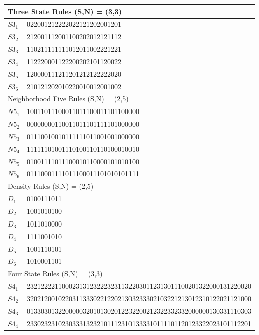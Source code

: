 \documentclass{article}
\begin{document}
\begin{multicols}{2}
\begin{table}[!htb] \centering
\small
\begin{tabular}{|p{2cm}|l|}
\hline
\multicolumn{2}{|l|}{Three State Rules (S,N) = (3,3)} \\ \hline
$S3_{1}$ &  022001212222022121202001201 \\ \hline
$S3_{2}$ &  212001112001100202012121112 \\ \hline
$S3_{3}$ &  110211111111012011002221221 \\ \hline
$S3_{4}$ &  112220001122200202101120022 \\ \hline
$S3_{5}$ &  120000111211201212122222020 \\ \hline
$S3_{6}$ &  210121202010220010012001002 \\ \hline
\multicolumn{2}{|l|}{Neighborhood Five Rules (S,N) = (2,5)} \\ \hline
$N5_{1}$ &  10011011100011011100011101100000 \\ \hline
$N5_{2}$ &  00000000110011011101111101000000 \\ \hline
$N5_{3}$ &  01110010010111111011001001000000 \\ \hline
$N5_{4}$ &  11111101001110100110110100010010 \\ \hline
$N5_{5}$ &  01001111011100010110000101010100 \\ \hline
$N5_{6}$ &  01110001111011100011101010101111 \\ \hline
\multicolumn{2}{|l|}{Density Rules (S,N) = (2,5)} \\ \hline
$D_{1}$ &  0100111011\\ \hline
$D_{2}$ &  1001010100\\ \hline
$D_{3}$ &  1011010000\\ \hline
$D_{4}$ &  1111001010\\ \hline
$D_{5}$ &  1001110101\\ \hline
$D_{6}$ &  1010001101\\ \hline
\multicolumn{2}{|l|}{Four State Rules (S,N) = (3,3)} \\ \hline
$S4_{1}$ &  2321222211000231312322232311322030112313011100201322000131220020\\ 
\hline
$S4_{2}$ &  3202120010220311333022122021303233302103221213012310122021121000\\ 
\hline
$S4_{3}$ &  0133030132200000320101302012232200212322332332000000130331110303\\ 
\hline
$S4_{4}$ &  2330232310230333132321011123101333310111101120123322023101112201\\ 

\end{tabular}
\end{table}
\end{multicols}
\end{document}
